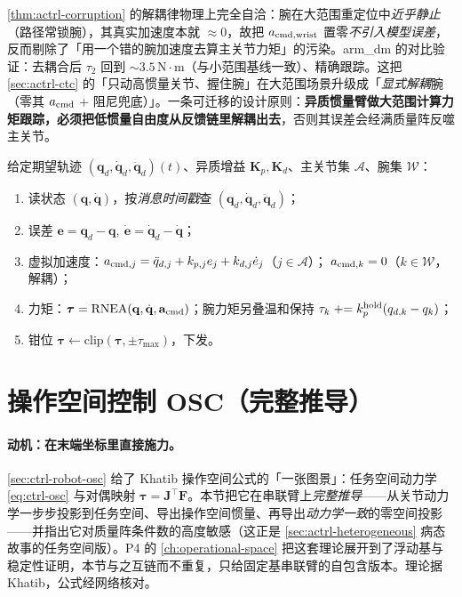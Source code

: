 \begin{insight}
\cref{thm:actrl-corruption} 的解耦律物理上完全自洽：腕在大范围重定位中\emph{近乎静止}（路径常锁腕），其真实加速度本就 $\approx0$，故把 $a_{{\rm cmd,wrist}}$ 置零\emph{不引入模型误差}，反而剔除了「用一个错的腕加速度去算主关节力矩」的污染。arm\_dm 的对比验证：去耦合后 $\tau_2$ 回到 $\sim3.5\,\mathrm{N\!\cdot\!m}$（与小范围基线一致）、精确跟踪。这把 \cref{sec:actrl-ctc} 的「只动高惯量关节、握住腕」在大范围场景升级成「\emph{显式解耦}腕（零其 $a_{\rm cmd}$ + 阻尼兜底）」。一条可迁移的设计原则：\textbf{异质惯量臂做大范围计算力矩跟踪，必须把低惯量自由度从反馈链里解耦出去}，否则其误差会经满质量阵反噬主关节。
\end{insight}

\begin{algo}
\label{algo:actrl-hetero-ct}
给定期望轨迹 $(\mathbf{q}_d,\dot{\mathbf{q}}_d,\ddot{\mathbf{q}}_d)(t)$、异质增益 $\mathbf{K}_p,\mathbf{K}_d$、主关节集 $\mathcal{A}$、腕集 $\mathcal{W}$：
\begin{enumerate}
  \item 读状态 $(\mathbf{q},\dot{\mathbf{q}})$，按\emph{消息时间戳}查 $(\mathbf{q}_d,\dot{\mathbf{q}}_d,\ddot{\mathbf{q}}_d)$；
  \item 误差 $\mathbf{e}=\mathbf{q}_d-\mathbf{q},\ \dot{\mathbf{e}}=\dot{\mathbf{q}}_d-\dot{\mathbf{q}}$；
  \item 虚拟加速度：$a_{{\rm cmd},j}=\ddot{q}_{d,j}+k_{p,j}e_j+k_{d,j}\dot{e}_j$（$j\in\mathcal{A}$）；$\;a_{{\rm cmd},k}=0$（$k\in\mathcal{W}$，解耦）；
  \item 力矩：$\boldsymbol{\tau}=\mathrm{RNEA}(\mathbf{q},\dot{\mathbf{q}},\mathbf{a}_{\rm cmd})$；腕力矩另叠温和保持 $\tau_k\mathrel{+}=k_p^{\rm hold}(q_{d,k}-q_k)$；
  \item 钳位 $\boldsymbol{\tau}\leftarrow\mathrm{clip}(\boldsymbol{\tau},\pm\tau_{\max})$，下发。
\end{enumerate}
\end{algo}

\section{操作空间控制 OSC（完整推导）}
\label{sec:actrl-osc}

\paragraph{动机：在末端坐标里直接施力。}
\cref{sec:ctrl-robot-osc} 给了 Khatib 操作空间公式的「一张图景」：任务空间动力学 \cref{eq:ctrl-osc} 与对偶映射 $\boldsymbol{\tau}=\mathbf{J}^\top\mathbf{F}$。本节把它在串联臂上\emph{完整推导}——从关节动力学一步步投影到任务空间、导出操作空间惯量、再导出\emph{动力学一致}的零空间投影——并指出它对质量阵条件数的高度敏感（这正是 \cref{sec:actrl-heterogeneous} 病态故事的任务空间版）。P4 的 \cref{ch:operational-space} 把这套理论展开到了浮动基与稳定性证明，本节与之互链而不重复，只给固定基串联臂的自包含版本。理论据 Khatib\cite{khatib1987operational}，公式经网络核对\rebuilt{}。

